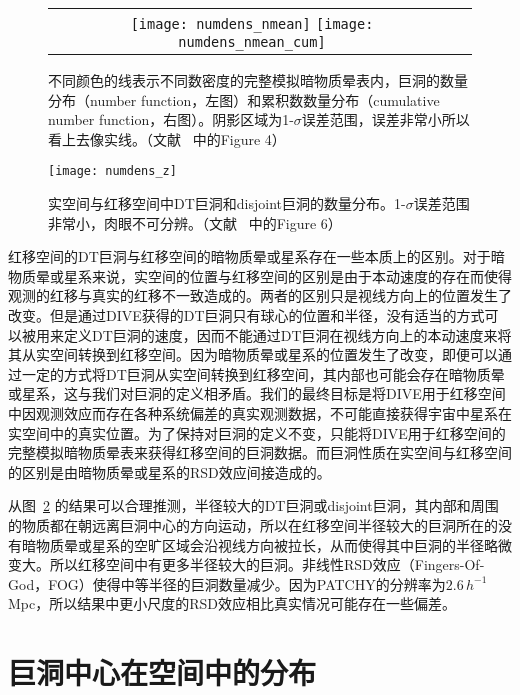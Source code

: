 \begin{figure}
\begin{tabular}{cc}
\texttt{[image: numdens\_nmean]}
\texttt{[image: numdens\_nmean\_cum]}
\end{tabular}
\caption{不同颜色的线表示不同数密度的完整模拟暗物质晕表内，巨洞的数量分布（number function，左图）和累积数数量分布（cumulative number function，右图）。阴影区域为1-$\sigma$误差范围，误差非常小所以看上去像实线。（文献 ~中的Figure 4）}
\label{fig:ndens_nmean}
\end{figure}

\begin{figure}
\centering
\texttt{[image: numdens\_z]}
\caption{实空间与红移空间中DT巨洞和disjoint巨洞的数量分布。1-$\sigma$误差范围非常小，肉眼不可分辨。（文献 ~中的Figure 6）}
\label{fig:ndens_z}
\end{figure}

红移空间的DT巨洞与红移空间的暗物质晕或星系存在一些本质上的区别。对于暗物质晕或星系来说，实空间的位置与红移空间的区别是由于本动速度的存在而使得观测的红移与真实的红移不一致造成的。两者的区别只是视线方向上的位置发生了改变。但是通过DIVE获得的DT巨洞只有球心的位置和半径，没有适当的方式可以被用来定义DT巨洞的速度，因而不能通过DT巨洞在视线方向上的本动速度来将其从实空间转换到红移空间。因为暗物质晕或星系的位置发生了改变，即便可以通过一定的方式将DT巨洞从实空间转换到红移空间，其内部也可能会存在暗物质晕或星系，这与我们对巨洞的定义相矛盾。我们的最终目标是将DIVE用于红移空间中因观测效应而存在各种系统偏差的真实观测数据，不可能直接获得宇宙中星系在实空间中的真实位置。为了保持对巨洞的定义不变，只能将DIVE用于红移空间的完整模拟暗物质晕表来获得红移空间的巨洞数据。而巨洞性质在实空间与红移空间的区别是由暗物质晕或星系的RSD效应间接造成的。

从图~\ref{fig:ndens_z} 的结果可以合理推测，半径较大的DT巨洞或disjoint巨洞，其内部和周围的物质都在朝远离巨洞中心的方向运动，所以在红移空间半径较大的巨洞所在的没有暗物质晕或星系的空旷区域会沿视线方向被拉长，从而使得其中巨洞的半径略微变大。所以红移空间中有更多半径较大的巨洞。非线性RSD效应（Fingers-Of-God，FOG）使得中等半径的巨洞数量减少。因为\textsc{PATCHY}的分辨率为$2.6\,h^{-1}$Mpc，所以结果中更小尺度的RSD效应相比真实情况可能存在一些偏差。

\section{巨洞中心在空间中的分布}


